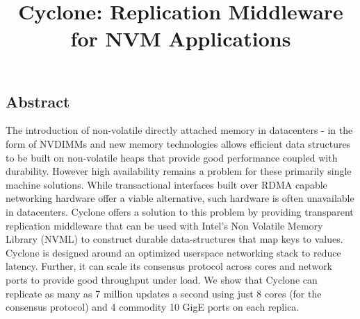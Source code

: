 \documentclass[letterpaper,twocolumn,10pt]{article}
\begin{document}
\date{}

\title{\Large \bf Cyclone: Replication Middleware for NVM Applications}


\maketitle


\subsection*{Abstract}
The introduction of non-volatile directly attached memory in datacenters - in
the form of NVDIMMs and new memory technologies allows efficient data structures
to be built on non-volatile heaps that provide good performance coupled with
durability. However high availability remains a problem for these primarily
single machine solutions. While transactional interfaces built over RDMA capable
networking hardware offer a viable alternative, such hardware is often
unavailable in datacenters. Cyclone offers a solution to this problem by
providing transparent replication middleware that can be used with Intel's Non
Volatile Memory Library (NVML) to construct durable data-structures that map
keys to values.  Cyclone is designed around an optimized userspace networking
stack to reduce latency. Further, it can scale its consensus protocol across
cores and network ports to provide good throughput under load. We show that
Cyclone can replicate as many as 7 million updates a second using just 8 cores
(for the consensus protocol) and 4 commodity 10 GigE ports on each replica.
\end{document}
